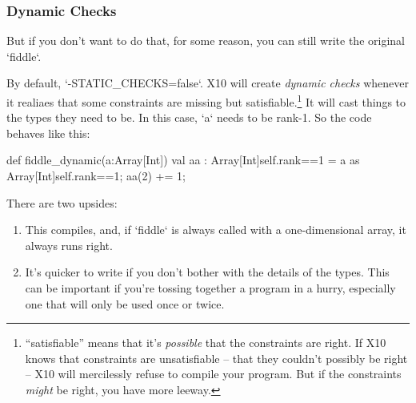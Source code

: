 \subsubsection{Dynamic Checks}


But if you don't want to do that, for some reason, you can still write the
original \xcd`fiddle`.  

By default, \xcd`-STATIC_CHECKS=false`.  X10 will create {\em dynamic checks}
whenever it realiaes that some constraints are missing but
satisfiable.\footnote{``satisfiable'' means that it's {\em possible} that the
constraints are right.  If X10 knows that constraints are unsatisfiable --
that they couldn't possibly be right -- X10 will mercilessly refuse to compile
your program.  But if the constraints {\em might} be right, you have more
leeway.} 
It will cast things to the types they need to be.  
In this case, \xcd`a` needs to be rank-1.  So the code behaves like this:
\begin{xtennum}[]
def fiddle_dynamic(a:Array[Int]) {
  val aa : Array[Int]{self.rank==1} 
         = a as Array[Int]{self.rank==1};
  aa(2) += 1;
}
\end{xtennum}

There are two upsides:
\begin{enumerate}
\item This compiles, and, if \xcd`fiddle` is always called
with a one-dimensional array, it always runs right.  
\item It's quicker to write if you don't bother with the details of the types.
      This can be important if you're tossing together a program in a hurry,
      especially one that will only be used once or twice. 
\end{enumerate}

